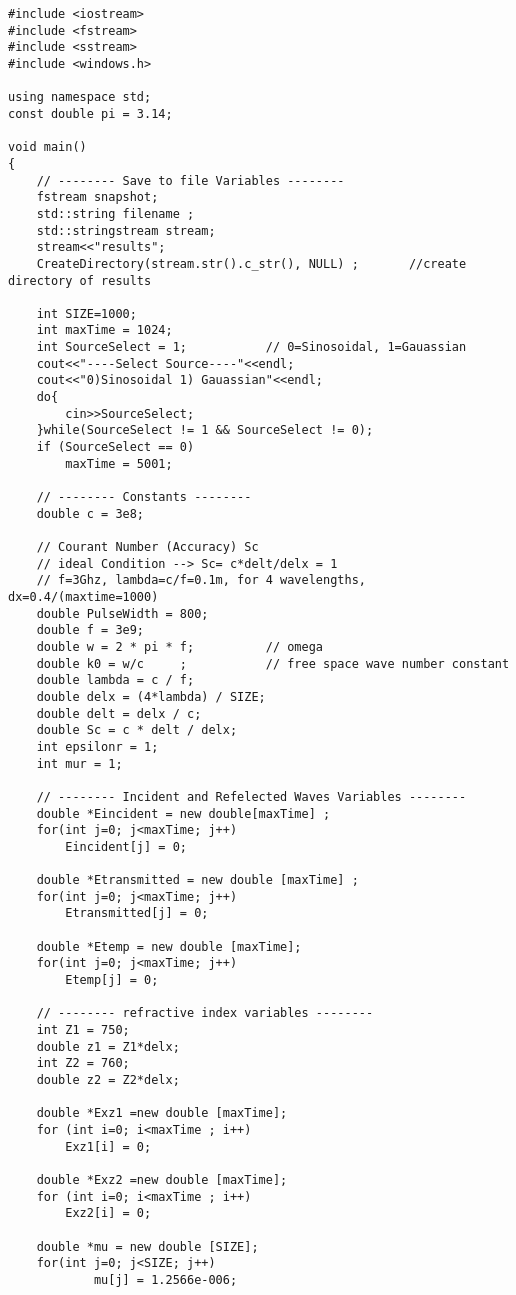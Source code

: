 \begin{lstlisting}
#include <iostream>
#include <fstream>
#include <sstream>
#include <windows.h>

using namespace std;
const double pi = 3.14;

void main()
{
	// -------- Save to file Variables -------- 
	fstream snapshot;
	std::string filename ;
	std::stringstream stream;
	stream<<"results";
	CreateDirectory(stream.str().c_str(), NULL) ;		//create directory of results

	int SIZE=1000;
    int maxTime = 1024;
	int SourceSelect = 1; 			// 0=Sinosoidal, 1=Gauassian
	cout<<"----Select Source----"<<endl;
	cout<<"0)Sinosoidal 1) Gauassian"<<endl;
	do{
		cin>>SourceSelect;
	}while(SourceSelect != 1 && SourceSelect != 0);
	if (SourceSelect == 0)
		maxTime = 5001;

	// -------- Constants -------- 
	double c = 3e8;

 	// Courant Number (Accuracy) Sc
	// ideal Condition --> Sc= c*delt/delx = 1
	// f=3Ghz, lambda=c/f=0.1m, for 4 wavelengths, dx=0.4/(maxtime=1000)
	double PulseWidth = 800;
	double f = 3e9;
	double w = 2 * pi * f;    		// omega
	double k0 = w/c     ; 			// free space wave number constant
	double lambda = c / f;
	double delx = (4*lambda) / SIZE;
	double delt = delx / c;
	double Sc = c * delt / delx;
	int epsilonr = 1;
	int mur = 1;

    // -------- Incident and Refelected Waves Variables -------- 
	double *Eincident = new double[maxTime] ; 
	for(int j=0; j<maxTime; j++)
		Eincident[j] = 0;
	
	double *Etransmitted = new double [maxTime] ;
	for(int j=0; j<maxTime; j++)
		Etransmitted[j] = 0;

	double *Etemp = new double [maxTime];
	for(int j=0; j<maxTime; j++)
		Etemp[j] = 0;

	// -------- refractive index variables -------- 
	int Z1 = 750;
	double z1 = Z1*delx;
	int Z2 = 760;
	double z2 = Z2*delx;

	double *Exz1 =new double [maxTime];
	for (int i=0; i<maxTime ; i++)
		Exz1[i] = 0;

	double *Exz2 =new double [maxTime];
	for (int i=0; i<maxTime ; i++)
		Exz2[i] = 0;
	
	double *mu = new double [SIZE];
	for(int j=0; j<SIZE; j++)
			mu[j] = 1.2566e-006;


\end{lstlisting}
